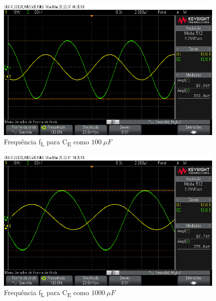 \documentclass[journal, a4paper]{IEEEtran}
\begin{document}
    \begin{figure}[H]
        \begin{center}
        \includegraphics[width=\columnwidth]{100micro.png}
        \caption{Frequência f\textsubscript{L} para C\textsubscript{E} como $100 \: \mu F$}
        \label{fl_100}
        \end{center}
    \end{figure}
    
    \begin{figure}[H]
        \begin{center}
        \includegraphics[width=\columnwidth]{1000micro.png}
        \caption{Frequência f\textsubscript{L} para C\textsubscript{E} como $1000 \: \mu F$}
        \label{fl_1000}
        \end{center}
    \end{figure}
    
\end{document}
